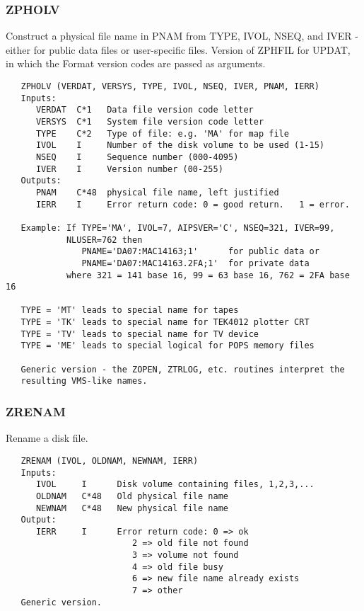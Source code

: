 \subsubsection{ZPHOLV}
Construct a physical file name in PNAM from TYPE, IVOL, NSEQ, and
IVER - either for public data files or user-specific files.
Version of ZPHFIL for UPDAT, in which the Format version codes are
passed as arguments.
\begin{verbatim}
   ZPHOLV (VERDAT, VERSYS, TYPE, IVOL, NSEQ, IVER, PNAM, IERR)
   Inputs:
      VERDAT  C*1   Data file version code letter
      VERSYS  C*1   System file version code letter
      TYPE    C*2   Type of file: e.g. 'MA' for map file
      IVOL    I     Number of the disk volume to be used (1-15)
      NSEQ    I     Sequence number (000-4095)
      IVER    I     Version number (00-255)
   Outputs:
      PNAM    C*48  physical file name, left justified
      IERR    I     Error return code: 0 = good return.   1 = error.

   Example: If TYPE='MA', IVOL=7, AIPSVER='C', NSEQ=321, IVER=99,
            NLUSER=762 then
               PNAME='DA07:MAC14163;1'      for public data or
               PNAME='DA07:MAC14163.2FA;1'  for private data
            where 321 = 141 base 16, 99 = 63 base 16, 762 = 2FA base 16

   TYPE = 'MT' leads to special name for tapes
   TYPE = 'TK' leads to special name for TEK4012 plotter CRT
   TYPE = 'TV' leads to special name for TV device
   TYPE = 'ME' leads to special logical for POPS memory files

   Generic version - the ZOPEN, ZTRLOG, etc. routines interpret the
   resulting VMS-like names.
\end{verbatim}

\subsubsection{ZRENAM}
Rename a disk file.
\begin{verbatim}
   ZRENAM (IVOL, OLDNAM, NEWNAM, IERR)
   Inputs:
      IVOL     I      Disk volume containing files, 1,2,3,...
      OLDNAM   C*48   Old physical file name
      NEWNAM   C*48   New physical file name
   Output:
      IERR     I      Error return code: 0 => ok
                         2 => old file not found
                         3 => volume not found
                         4 => old file busy
                         6 => new file name already exists
                         7 => other
   Generic version.
\end{verbatim}

